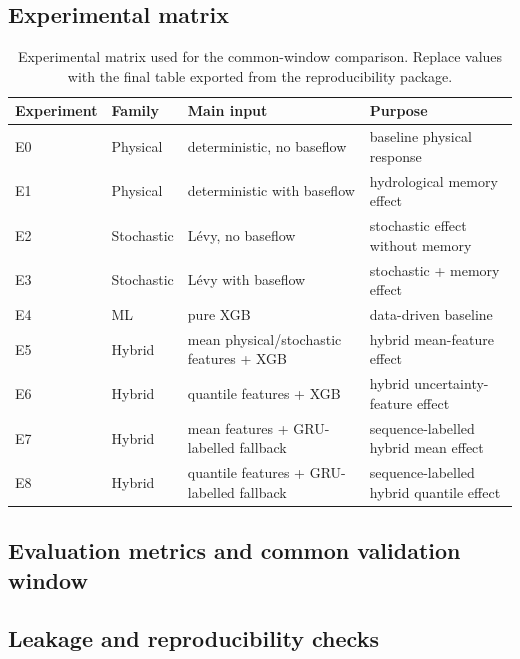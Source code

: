 \documentclass[preprint,12pt]{elsarticle}
\begin{document}
\subsection{Experimental matrix}
\begin{table}[htbp]
\centering
\caption{Experimental matrix used for the common-window comparison. Replace values with the final table exported from the reproducibility package.}
\label{tab:experimental_matrix}
\begin{tabular}{llll}
\toprule
Experiment & Family & Main input & Purpose \\
\midrule
E0 & Physical & deterministic, no baseflow & baseline physical response \\
E1 & Physical & deterministic with baseflow & hydrological memory effect \\
E2 & Stochastic & Lévy, no baseflow & stochastic effect without memory \\
E3 & Stochastic & Lévy with baseflow & stochastic + memory effect \\
E4 & ML & pure XGB & data-driven baseline \\
E5 & Hybrid & mean physical/stochastic features + XGB & hybrid mean-feature effect \\
E6 & Hybrid & quantile features + XGB & hybrid uncertainty-feature effect \\
E7 & Hybrid & mean features + GRU-labelled fallback & sequence-labelled hybrid mean effect \\
E8 & Hybrid & quantile features + GRU-labelled fallback & sequence-labelled hybrid quantile effect \\
\bottomrule
\end{tabular}
\end{table}

\subsection{Evaluation metrics and common validation window}

\subsection{Leakage and reproducibility checks}

\end{document}
